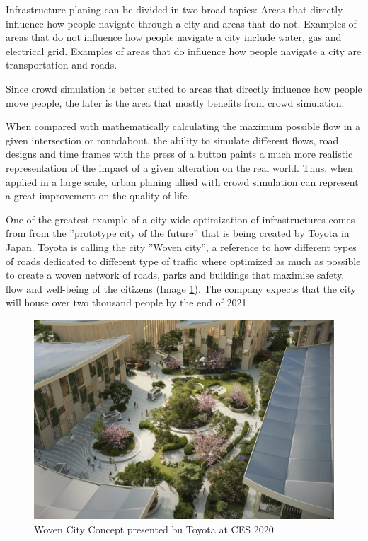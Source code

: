 \documentclass[sigconf]{acmart}
\begin{document}
Infrastructure planing can be divided in two broad topics: Areas that directly influence how people
navigate through a city and areas that do not. Examples of areas that do not influence how people
navigate a city include water, gas and electrical grid. Examples of areas that do influence how people
navigate a city are transportation and roads\cite{urbanPlanning}.

Since crowd simulation is better suited to areas that directly influence how people move people,
the later is the area that mostly benefits from crowd simulation.

When compared with mathematically calculating the maximum possible flow in a given intersection or roundabout,
the ability to simulate different flows, road designs and time frames with the press of a button paints a much
more realistic representation of the impact of a given alteration on the real world. Thus, when applied in a
large scale, urban planing allied with crowd simulation can represent a great improvement on the quality of life. 

One of the greatest example of a city wide optimization of infrastructures comes from from the ''prototype
city of the future'' that is being created by Toyota in Japan\cite{wovenCity}. Toyota is calling the city
''Woven city'', a reference to how different types of roads dedicated to different type of traffic where
optimized as much as possible to create a woven network of roads, parks and buildings that maximise safety,
flow and well-being of the citizens (Image \ref{fig:woven}). The company expects that the city will house
over two thousand people by the end of 2021.

\begin{figure}[h]
  \centering
  \includegraphics[width=\linewidth]{images/woven_city.jpg}
  \caption{Woven City Concept presented bu Toyota at CES 2020}
  \label{fig:woven}
\end{figure}
\end{document}
